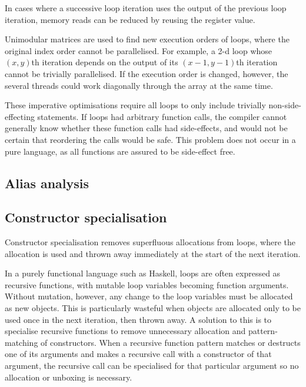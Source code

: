 In cases where a successive loop iteration uses the output of the previous loop iteration, memory reads can be reduced by reusing the register value\cite{wang2013loop}.

Unimodular matrices are used to find new execution orders of loops, where the original index order cannot be parallelised\cite{banerjee1993loop}.
For example, a 2-d loop whose $(x,y)$th iteration depends on the output of its $(x-1,y-1)$th iteration cannot be trivially parallelised.
If the execution order is changed, however, the several threads could work diagonally through the array at the same time.

These imperative optimisations require all loops to only include trivially non-side-effecting statements.
If loops had arbitrary function calls, the compiler cannot generally know whether these function calls had side-effects,
and would not be certain that reordering the calls would be safe.
This problem does not occur in a pure language, as all functions are assured to be side-effect free.

\subsection{Alias analysis}


\subsection{Constructor specialisation}

Constructor specialisation removes superfluous allocations from loops\cite{bechet1994limix},
where the allocation is used and thrown away immediately at the start of the next iteration.

In a purely functional language such as Haskell, loops are often expressed as recursive functions, with mutable loop variables becoming function arguments. 
Without mutation, however, any change to the loop variables must be allocated as new objects\cite{peyton2007call}.
This is particularly wasteful when objects are allocated only to be used once in the next iteration, then thrown away.
A solution to this is to specialise recursive functions to remove unnecessary allocation and pattern-matching of constructors.
When a recursive function pattern matches or destructs one of its arguments and makes a recursive call with a constructor of that argument,
the recursive call can be specialised for that particular argument so no allocation or unboxing is necessary.

